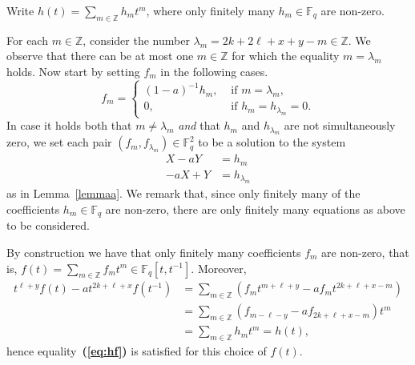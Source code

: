 \documentclass[a4paper,11pt]{amsart}
\makeatletter
\numberwithin{equation}{section}
\theoremstyle{plain}
\theoremstyle{definition}
\renewenvironment{proof}[1][\proofname] {\par\pushQED{\qed}\normalfont\topsep6\p@\@plus6\p@\relax\trivlist\item[\hskip\labelsep\bfseries#1\@addpunct{.}]\ignorespaces}{\popQED\endtrivlist\@endpefalse}
\newcommand{\Z}{\mathbb{Z}}
\newcommand{\F}{\mathbb{F}}
\newcommand{\bref}[1]{{\bf(\ref{#1})}} %
\makeatother
\begin{document}
\begin{proof}
Write $h(t)=\sum_{m\in\Z}h_m t^m$, where only finitely many $h_m\in\F_q$ are non-zero. 

For each $m \in \Z$, consider the number $\lambda_m=2k+2\ell+x+y-m \in \Z$. We observe that there can be at most one $m \in \Z$ for which the equality $m = \lambda_m$ holds. Now start by setting $f_m$ in the following cases. 
\[f_m=\begin{cases} (1-a)^{-1}h_m, &\text{ if } m=\lambda_m, \\ 
0, &\text{ if } h_m=h_{\lambda_m}=0.
\end{cases}\]
In case it holds both that $m \neq \lambda_m$ \emph{and} that $h_m$ and $h_{\lambda_m}$ are not {simultaneously} zero, we set each pair $(f_m,f_{\lambda_m}) \in \F_q^2$ to be a solution to the system 
\begin{align*} X-aY&=h_m\\
			  -aX+Y&=h_{\lambda_m}
\end{align*}
as in Lemma~\ref{lemmaa}. We remark that, since only finitely many of the coefficients $h_m \in \F_q$ are non-zero, there are only finitely many equations as above to be considered. 

By construction we have that only finitely many coefficients $f_m$ are non-zero, that is, $f(t)=\sum_{m \in \Z}f_mt^m \in \F_q[t,t^{-1}]$. Moreover,  
\begin{align*} t^{\ell+y}f(t)-at^{2k+\ell+x}f(t^{-1}) & = \sum_{m\in\Z} \left(f_mt^{m+\ell+y}-af_mt^{2k+\ell+x-m}\right)\\
& = \sum_{m\in\Z} (f_{m-\ell-y}-af_{2k+\ell+x-m})t^m\\
& = \sum_{m\in\Z} h_mt^m = h(t),
\end{align*}
hence equality~\bref{eq:hf} is satisfied for this choice of $f(t)$. 


\end{proof}
\end{document}
